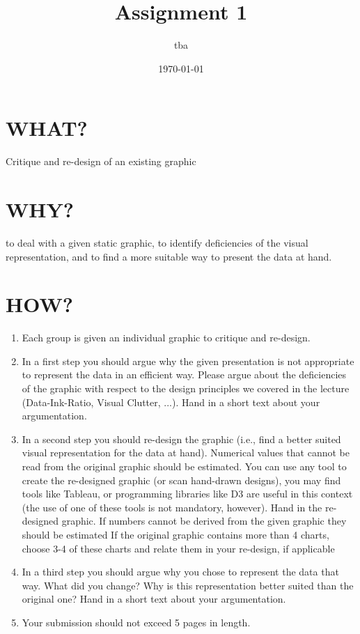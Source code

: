\documentclass{article}
\title{Assignment 1}
\author{tba}
\date{\today}
\begin{document}
\maketitle


\section{WHAT?}

Critique and re-design of an existing graphic

\section{WHY?}

to deal with a given static graphic, to identify deficiencies of the visual representation, and to find a more suitable way to present the data at hand.

\section{HOW?}

\begin{enumerate}
    \item Each group is given an individual graphic to critique and re-design.
    \item In a first step you should argue why the given presentation is not appropriate to represent the data in an efficient way. Please argue about the deficiencies of the graphic with respect to the design principles we covered in the lecture (Data-Ink-Ratio, Visual Clutter, ...).  Hand in a short text about your argumentation.
    \item In a second step you should re-design the graphic (i.e., find a better suited visual representation for the data at hand). Numerical values that cannot be read from the original graphic should be estimated. You can use any tool to create the re-designed graphic (or scan hand-drawn designs), you may find tools like Tableau, or programming libraries like D3 are useful in this context (the use of one of these tools is not mandatory, however). Hand in the re-designed graphic. If numbers cannot be derived from the given graphic they should be estimated If the original graphic contains more than 4 charts, choose 3-4 of these charts and relate them in your re-design, if applicable
    \item In a third step you should argue why you chose to represent the data that way. What did you change? Why is this representation better suited than the original one? Hand in a short text about your argumentation.
    \item Your submission should not exceed 5 pages in length.
\end{enumerate}
\end{document}
